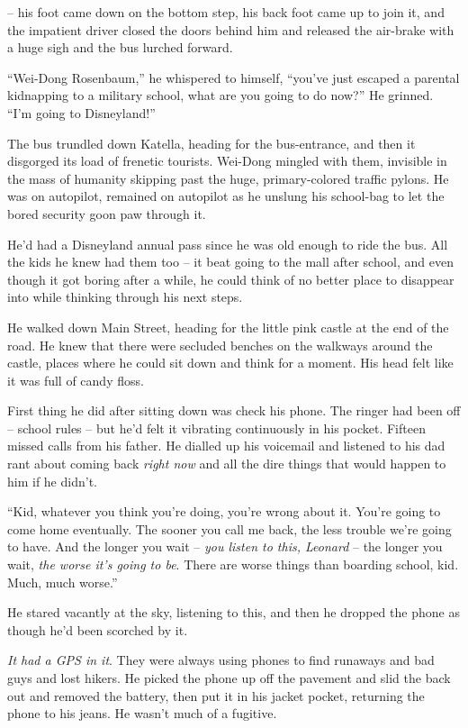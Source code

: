 -- his foot came down on the bottom step, his back foot came up to
join it, and the impatient driver closed the doors behind him and
released the air-brake with a huge sigh and the bus lurched
forward.

``Wei-Dong Rosenbaum,'' he whispered to himself, ``you've just escaped
a parental kidnapping to a military school, what are you going to
do now?'' He grinned. ``I'm going to Disneyland!''

The bus trundled down Katella, heading for the bus-entrance, and
then it disgorged its load of frenetic tourists. Wei-Dong mingled
with them, invisible in the mass of humanity skipping past the
huge, primary-colored traffic pylons. He was on autopilot, remained
on autopilot as he unslung his school-bag to let the bored security
goon paw through it.

He'd had a Disneyland annual pass since he was old enough to ride
the bus. All the kids he knew had them too -- it beat going to the
mall after school, and even though it got boring after a while, he
could think of no better place to disappear into while thinking
through his next steps.

He walked down Main Street, heading for the little pink castle at
the end of the road. He knew that there were secluded benches on
the walkways around the castle, places where he could sit down and
think for a moment. His head felt like it was full of candy floss.

First thing he did after sitting down was check his phone. The
ringer had been off -- school rules -- but he'd felt it vibrating
continuously in his pocket. Fifteen missed calls from his father.
He dialled up his voicemail and listened to his dad rant about
coming back \emph{right now} and all the dire things that would
happen to him if he didn't.

``Kid, whatever you think you're doing, you're wrong about it.
You're going to come home eventually. The sooner you call me back,
the less trouble we're going to have. And the longer you wait --
\emph{you listen to this, Leonard} -- the longer you wait,
\emph{the worse it's going to be}. There are worse things than
boarding school, kid. Much, much worse.''

He stared vacantly at the sky, listening to this, and then he
dropped the phone as though he'd been scorched by it.

\emph{It had a GPS in it}. They were always using phones to find
runaways and bad guys and lost hikers. He picked the phone up off
the pavement and slid the back out and removed the battery, then
put it in his jacket pocket, returning the phone to his jeans. He
wasn't much of a fugitive.


